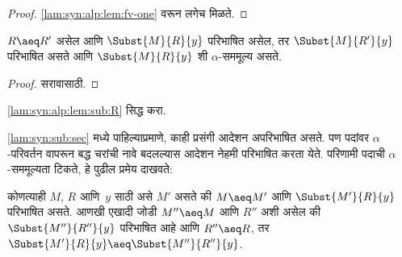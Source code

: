 \begin{proof}
  \ref{lam:syn:alp:lem:fv-one} वरून लगेच मिळते.
\end{proof}

\begin{lem}\label{lam:syn:alp:lem:sub:R}
  $R \aeq R'$ असेल आणि $\Subst{M}{R}{y}$ परिभाषित
  असेल, तर $\Subst{M}{R'}{y}$ परिभाषित असते आणि
  $\Subst{M}{R}{y}$ शी $\alpha$-सममूल्य असते.
\end{lem}

\begin{proof}
  सरावासाठी.
\end{proof}

\begin{prob}
  \ref{lam:syn:alp:lem:sub:R} सिद्ध करा.
\end{prob}

\ref{lam:syn:sub:sec} मध्ये पाहिल्याप्रमाणे, काही प्रसंगी
आदेशन अपरिभाषित असते. पण पदांवर $\alpha$-परिवर्तन
वापरून बद्ध चरांची नावे बदलल्यास आदेशन नेहमी परिभाषित
करता येते. परिणामी पदाची $\alpha$-सममूल्यता टिकते,
हे पुढील प्रमेय दाखवते:

\begin{thm}\label{lam:syn:alp:thm:sub}
  कोणत्याही $M$, $R$ आणि~$y$ साठी असे $M'$ असते की
  $M \aeq M'$ आणि $\Subst{M'}{R}{y}$ परिभाषित असते.
  आणखी एखादी जोडी $M'' \aeq M$ आणि $R''$ अशी असेल
  की $\Subst{M''}{R''}{y}$ परिभाषित आहे आणि $R'' \aeq R$,
  तर $\Subst{M'}{R}{y} \aeq \Subst{M''}{R''}{y}$.
\end{thm}

